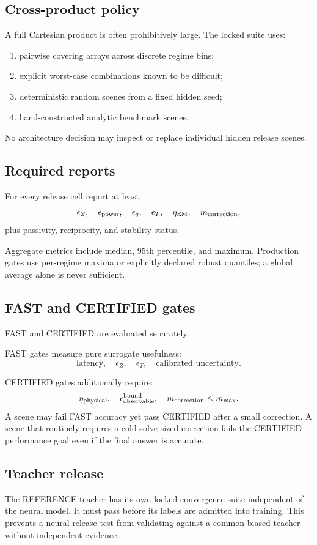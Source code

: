 \subsection{Cross-product policy}

A full Cartesian product is often prohibitively large. The locked suite uses:
\begin{enumerate}
\item pairwise covering arrays across discrete regime bins;
\item explicit worst-case combinations known to be difficult;
\item deterministic random scenes from a fixed hidden seed;
\item hand-constructed analytic benchmark scenes.
\end{enumerate}
No architecture decision may inspect or replace individual hidden release
scenes.

\subsection{Required reports}

For every release cell report at least:
\[
 \epsilon_Z,\quad
 \epsilon_{\rm power},\quad
 \epsilon_q,\quad
 \epsilon_T,\quad
 \eta_{\rm EM},\quad
 m_{\rm correction},
\]
plus passivity, reciprocity, and stability status.

Aggregate metrics include median, 95th percentile, and maximum. Production
gates use per-regime maxima or explicitly declared robust quantiles; a global
average alone is never sufficient.

\subsection{FAST and CERTIFIED gates}

FAST and CERTIFIED are evaluated separately.

FAST gates measure pure surrogate usefulness:
\[
  \text{latency},\quad
  \epsilon_Z,\quad
  \epsilon_T,\quad
  \text{calibrated uncertainty}.
\]

CERTIFIED gates additionally require:
\[
  \eta_{\rm physical},\quad
  \epsilon_{\rm observable}^{\rm bound},\quad
  m_{\rm correction}\le m_{\max}.
\]
A scene may fail FAST accuracy yet pass CERTIFIED after a small correction. A
scene that routinely requires a cold-solve-sized correction fails the
CERTIFIED performance goal even if the final answer is accurate.

\subsection{Teacher release}

The REFERENCE teacher has its own locked convergence suite independent of the
neural model. It must pass before its labels are admitted into training. This
prevents a neural release test from validating against a common biased teacher
without independent evidence.
